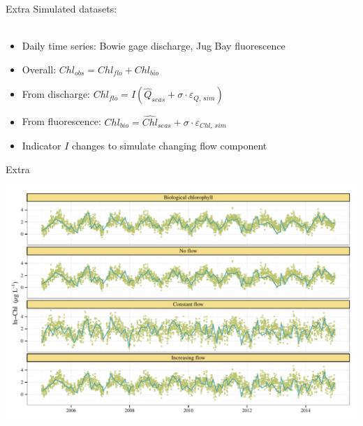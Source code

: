 \documentclass[serif]{beamer}\usepackage[]{graphicx}\usepackage[]{color}
\makeatletter
\def\maxwidth{ %
  \ifdim\Gin@nat@width>\linewidth
    \linewidth
  \else
    \Gin@nat@width
  \fi
}
\newenvironment{knitrout}{}{} %
\makeatother
\begin{document}
\begin{frame}{Extra}
Simulated datasets:\\~\\
\begin{itemize}
\item Daily time series: Bowie gage discharge, Jug Bay fluorescence
\item Overall: $Chl_{obs} = Chl_{flo} + Chl_{bio}$
\item From discharge: $Chl_{flo} = I\left(\widehat{Q}_{seas} + \sigma\cdot\varepsilon_{Q,\,sim}\right)$
\item From fluorescence: $Chl_{bio} = \widehat{Chl}_{seas} + \sigma\cdot\varepsilon_{Chl,\,sim}$
\item Indicator $I$ changes to simulate changing flow component
\end{itemize}
\end{frame}

\begin{frame}[fragile]{Extra}
\begin{knitrout}
\color{fgcolor}

{\centering \includegraphics[width=\maxwidth]{figs/unnamed-chunk-10-1} 

}



\end{knitrout}
\end{frame}
\end{document}
